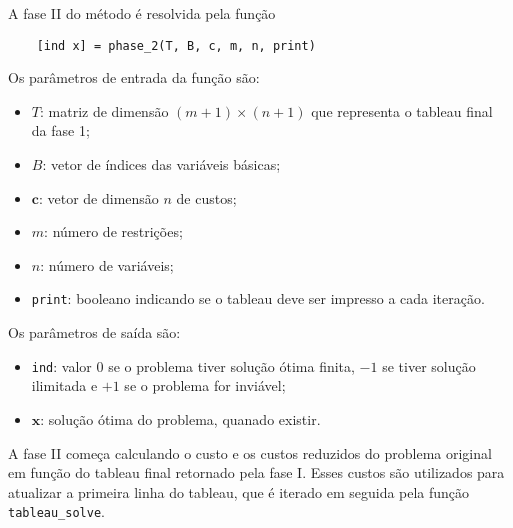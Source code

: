 \documentclass[12pt,a4paper]{article}
\newcommand{\vet}{\mathbf}                                   %
\begin{document}
A fase II do método é resolvida pela função
%
\begin{verbatim}
	[ind x] = phase_2(T, B, c, m, n, print)
\end{verbatim}
%
Os parâmetros de entrada da função são:
%
\begin{itemize}
	\item $T$: matriz de dimensão $(m+1) \times (n+1)$ que representa o tableau final da fase 1;
	\item $B$: vetor de índices das variáveis básicas;
	\item $\vet{c}$: vetor de dimensão $n$ de custos;
	\item $m$: número de restrições;
	\item $n$: número de variáveis;
	\item \verb|print|: booleano indicando se o tableau deve ser impresso a cada iteração.  
\end{itemize} 
%
Os parâmetros de saída são:
%
\begin{itemize}
	\item \verb|ind|: valor $0$ se o problema tiver solução ótima finita, $-1$ se tiver solução 
	ilimitada e $+1$ se o problema for inviável;
	\item $\vet{x}$: solução ótima do problema, quanado existir.
\end{itemize}
%
A fase II começa calculando o custo e os custos reduzidos do problema original em função do 
tableau final retornado pela fase I. Esses custos são utilizados para atualizar a primeira linha
do tableau, que é iterado em seguida pela função \verb|tableau_solve|.
\end{document}
